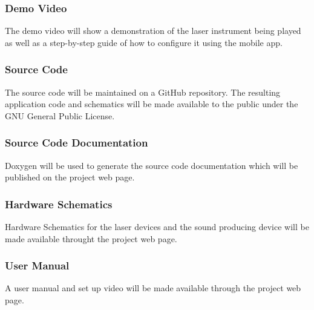 \subsubsection{Demo Video}
The demo video will show a demonstration of the laser instrument being played as well as a step-by-step guide of how to configure it using the mobile app.

\subsubsection{Source Code}
The source code will be maintained on a GitHub repository. The resulting application code and schematics will be made available to the public under the GNU General Public License.

\subsubsection{Source Code Documentation}
Doxygen will be used to generate the source code documentation which will be published on the project web page.

\subsubsection{Hardware Schematics}
Hardware Schematics for the laser devices and the sound producing device will be made available throught the project web page.

\subsubsection{User Manual}
A user manual and set up video will be made available through the project web page.
